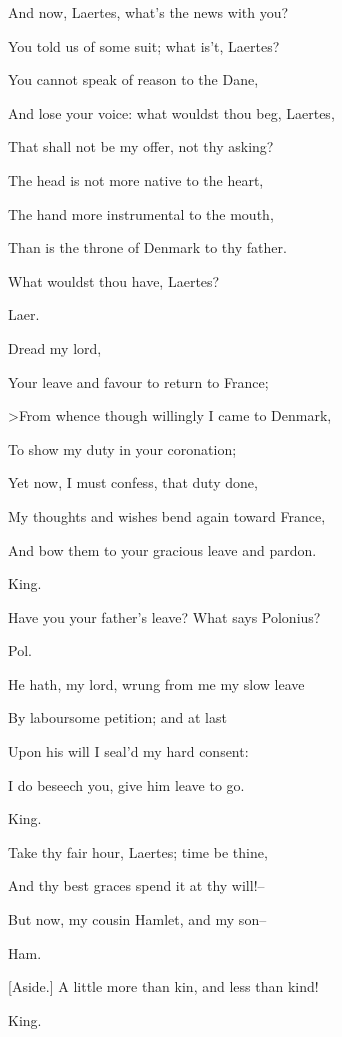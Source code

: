 \documentclass[12pt]{book}
\begin{document}
And now, Laertes, what's the news with you?

You told us of some suit; what is't, Laertes?

You cannot speak of reason to the Dane,

And lose your voice: what wouldst thou beg, Laertes,

That shall not be my offer, not thy asking?

The head is not more native to the heart,

The hand more instrumental to the mouth,

Than is the throne of Denmark to thy father.

What wouldst thou have, Laertes?



Laer.

Dread my lord,

Your leave and favour to return to France;

>From whence though willingly I came to Denmark,

To show my duty in your coronation;

Yet now, I must confess, that duty done,

My thoughts and wishes bend again toward France,

And bow them to your gracious leave and pardon.



King.

Have you your father's leave? What says Polonius?



Pol.

He hath, my lord, wrung from me my slow leave

By laboursome petition; and at last

Upon his will I seal'd my hard consent:

I do beseech you, give him leave to go.



King.

Take thy fair hour, Laertes; time be thine,

And thy best graces spend it at thy will!--

But now, my cousin Hamlet, and my son--



Ham.

[Aside.] A little more than kin, and less than kind!



King.
\end{document}
